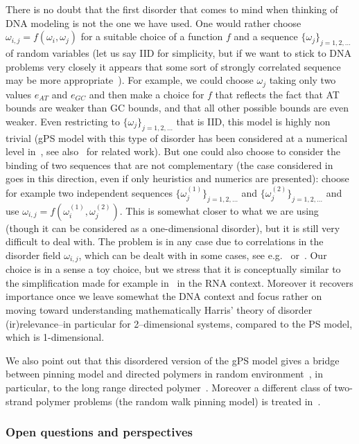 \documentclass[11pt]{article}
\theoremstyle{definition}
\numberwithin{equation}{section}
\numberwithin{figure}{section}
\numberwithin{table}{section}
\newcommand{\go}{\omega}
\begin{document}
There is no doubt that the first disorder that comes to mind when thinking of DNA modeling is not the one we have used. One would rather choose $\go_{i,j}=f(\go_i, \go_j)$ for a suitable choice of a function $f$ and a sequence $\{\go_j\}_{j=1,2, \ldots}$ of random variables (let us say IID for simplicity, but if we want to stick to DNA problems very closely it appears that some sort of strongly correlated sequence may be more appropriate~\cite{cf:Peng}). For example, we could choose $\go_j$ taking only two values $e_{AT}$ and $e_{GC}$ and then make a choice for $f$ that reflects the fact that AT bounds are weaker than GC bounds, and that all other possible bounds are even weaker. Even restricting to $\{\go_j\}_{j=1,2, \ldots}$ that is IID, this model is highly non trivial (gPS model with this type of disorder has been considered at a numerical level in~\cite{cf:GOO,cf:GO04}, see also~\cite{cf:EON11,cf:TN08} for related work). But one could also choose to consider the binding of two sequences that are not complementary (the case considered in~\cite{cf:NG06} goes in this direction, even if only heuristics and numerics are presented): choose for example two independent sequences $\{\go^{(1)}_j\}_{j=1,2, \ldots}$ and $\{\go^{(2)}_j\}_{j=1,2, \ldots}$ and use $\go_{i,j}=f(\go^{(1)}_i, \go^{(2)}_j)$. This is somewhat closer to what we are using (though it can be considered as a one-dimensional disorder), but it is still very difficult to deal with. The problem is in any case due to correlations in the disorder field $\go_{i,j}$, which can be dealt with in some cases, see e.g.~\cite{cf:BL12,cf:BP15} or~\cite{cf:AB18, cf:CCP17}. Our choice is in a sense a toy choice, but we stress that it is conceptually similar to the simplification made for example in~\cite{cf:BundHwa} in the RNA context. Moreover it recovers importance once we leave somewhat the DNA context and focus rather on moving toward understanding mathematically Harris' theory of disorder (ir)relevance--in particular for 2--dimensional systems, compared to the PS model, which is 1-dimensional.

We also point out that this disordered version of the gPS model gives a bridge between pinning model and directed polymers in random environment~\cite{cf:Co07,cf:La10}, in particular, to the long range directed polymer~\cite{cf:Co07,cf:We15}. Moreover a different class of two-strand polymer problems (the random walk pinning model) is treated in~\cite{cf:BS1,cf:BS2,cf:BT10}.

\subsubsection{Open questions and perspectives}
\end{document}
